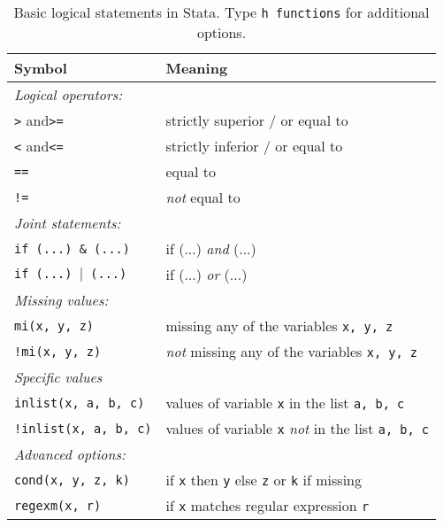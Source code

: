 \begin{table}
	\begin{center}
  	\footnotesize
  	\begin{tabular}{ll}
    	\toprule
    	Symbol & Meaning \\
    	\midrule
      \emph{Logical operators:} &\\
    	\quad \texttt{>} and\texttt{>=} & strictly superior / or equal to \\
    	\quad \texttt{<} and\texttt{<=} & strictly inferior / or equal to \\
    	\quad \texttt{==} & equal to \\
    	\quad \texttt{!=} & \emph{not} equal to \\
      \emph{Joint statements:} &\\
    	\quad \texttt{if (...) \& (...)} & if (...) \emph{and} (...)\\
      \quad \texttt{if (...) $\vert$ (...)}  & if (...) \emph{or} (...)\\
      \emph{Missing values:} &\\
    	\quad \texttt{mi(x, y, z)} & missing any of the variables \texttt{x, y, z}\\
    	\quad \texttt{!mi(x, y, z)} & \emph{not} missing any of the variables \texttt{x, y, z}\\
      \emph{Specific values} &\\
    	\quad \texttt{inlist(x, a, b, c)} & values of variable \texttt{x} in the list \texttt{a, b, c}\\
    	\quad \texttt{!inlist(x, a, b, c)} & values of variable \texttt{x} \emph{not} in the list \texttt{a, b, c}\\
      \emph{Advanced options:} &\\
      \quad \texttt{cond(x, y, z, k)} & if \texttt{x} then \texttt{y} else \texttt{z} or \texttt{k} if missing\\
      \quad \texttt{regexm(x, r)} & if \texttt{x} matches regular expression \texttt{r}\\
    	\bottomrule
  	\end{tabular}
	\end{center}
  \caption{Basic logical statements in Stata. Type \texttt{h functions} for additional options.}%
    \label{tbl:logical-symbols}%
\end{table}